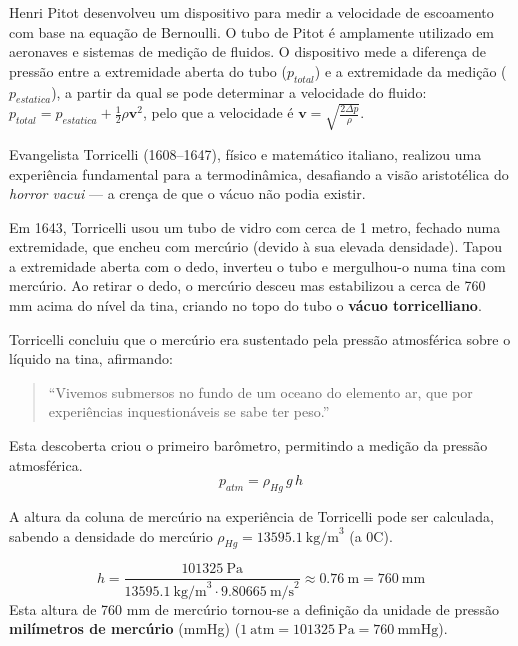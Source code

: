 \begin{historybox}

Henri Pitot desenvolveu um dispositivo para medir a velocidade de escoamento com base na equação de Bernoulli. O tubo de Pitot é amplamente utilizado em aeronaves e sistemas de medição de fluidos. O dispositivo mede a diferença de pressão entre a extremidade aberta do tubo ($p_{total}$) e a extremidade da medição ($p_{estatica}$), a partir da qual se pode determinar a velocidade do fluido: $p_{total} = p_{estatica} + \frac{1}{2} \rho \mathbf{v}^2$, pelo que a velocidade é $\mathbf{v} = \sqrt{\frac{2 \Delta p}{\rho}}$.

\end{historybox}


\begin{historybox}

Evangelista Torricelli (1608--1647), físico e matemático italiano, realizou uma experiência fundamental para a termodinâmica, desafiando a visão aristotélica do \textit{horror vacui} — a crença de que o vácuo não podia existir.

Em 1643, Torricelli usou um tubo de vidro com cerca de 1 metro, fechado numa extremidade, que encheu com mercúrio (devido à sua elevada densidade). Tapou a extremidade aberta com o dedo, inverteu o tubo e mergulhou-o numa tina com mercúrio. Ao retirar o dedo, o mercúrio desceu mas estabilizou a cerca de 760 mm acima do nível da tina, criando no topo do tubo o \textbf{vácuo torricelliano}.

Torricelli concluiu que o mercúrio era sustentado pela pressão atmosférica sobre o líquido na tina, afirmando:

\begin{quote}
    ``Vivemos submersos no fundo de um oceano do elemento ar, que por experiências inquestionáveis se sabe ter peso.''
\end{quote}


Esta descoberta criou o primeiro barômetro, permitindo a medição da pressão atmosférica.
\begin{equation*}
    p_{atm} = \rho_{Hg} \, g \, h
\end{equation*}

A altura da coluna de mercúrio na experiência de Torricelli pode ser calculada, sabendo a densidade do mercúrio $\rho_{Hg} = 13595.1~\text{kg/m}^3$ (a 0\textdegree C).

\begin{equation*}
    h = \frac{101325~\text{Pa}}{13595.1~\text{kg/m}^3 \cdot 9.80665~\text{m/s}^2} \approx 0.76~\text{m} = 760~\text{mm}
\end{equation*}
Esta altura de 760 mm de mercúrio tornou-se a definição da unidade de pressão \textbf{milímetros de mercúrio} (mmHg) ($1~\text{atm} = 101325~\text{Pa} = 760~\text{mmHg}$).


\end{historybox}
